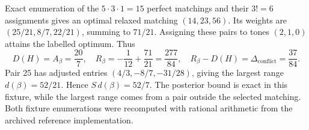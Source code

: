 \documentclass[10pt,letterpaper]{article}
\begin{document}
Exact enumeration of the $5\cdot3\cdot1=15$ perfect matchings and their $3!=6$ assignments gives an optimal relaxed matching $(14,23,56)$. Its weights are $(25/21,8/7,22/21)$, summing to $71/21$. Assigning these pairs to tones $(2,1,0)$ attains the labelled optimum. Thus
\begin{equation}
 D(H)=A_\beta=\frac{20}{7},\quad
 R_\beta=-\frac{1}{12}+\frac{71}{21}=\frac{277}{84},\quad
 R_\beta-D(H)=\Delta_{\mathrm{conflict}}=\frac{37}{84}.
 \label{supp:six-user-values}
\end{equation}
Pair 25 has adjusted entries $(4/3,-8/7,-31/28)$, giving the largest range $d(\beta)=52/21$. Hence $S\,d(\beta)=52/7$. The posterior bound is exact in this fixture, while the largest range comes from a pair outside the selected matching. Both fixture enumerations were recomputed with rational arithmetic from the archived reference implementation.
\end{document}
